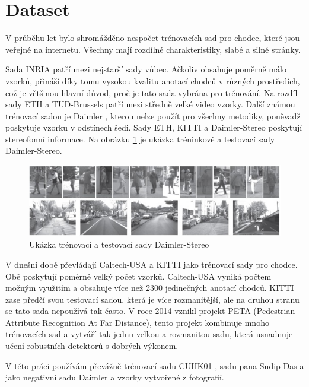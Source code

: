 \section{Dataset} %
V průběhu let bylo shromážděno nespočet trénovacích sad pro chodce, které jsou veřejné na internetu. Všechny mají rozdílné charakteristiky, slabé a silné stránky. 

Sada INRIA \cite{} patří mezi nejstarší sady vůbec. Ačkoliv obsahuje poměrně málo vzorků, přináší díky tomu vysokou kvalitu anotací chodců v různých prostředích, což je většinou hlavní důvod, proč je tato sada vybrána pro trénování. Na rozdíl sady ETH \cite{} a TUD-Brussels \cite{} patří mezi středně velké video vzorky. Další známou trénovací sadou je Daimler \cite{}, kterou nelze použít pro všechny metodiky, poněvadž poskytuje vzorku v odstínech šedi. Sady ETH, KITTI \cite{} a Daimler-Stereo \cite{} poskytují stereofonní informace. Na obrázku \ref{fig:daimler_stereo} je ukázka tréninkové a testovací sady Daimler-Stereo. 

\begin{figure}[H]
\centering
\includegraphics[width=16cm]{figures/daimler_stereo}
\caption{Ukázka trénovací a testovací sady Daimler-Stereo \cite{}}
\label{fig:daimler_stereo}
\end{figure}

V dnešní době převládají Caltech-USA \cite{} a KITTI jako trénovací sady pro chodce. Obě poskytují poměrně velký počet vzorků. Caltech-USA vyniká počtem možným využitím a obsahuje více než 2300 jedinečných anotací chodců. KITTI zase předčí svou testovací sadou, která je více rozmanitější, ale na druhou stranu se tato sada nepoužívá tak často. V roce 2014 vznikl projekt PETA (Pedestrian Attribute Recognition At Far Distance), tento projekt kombinuje mnoho trénovacích sad a vytváří tak jednu velkou a rozmanitou sadu, která usnadnuje učení robustních detektorů s dobrých výkonem.

V této práci používám převážně trénovací sadu CUHK01 \cite{}, sadu pana Sudip Das \cite{sudipdas} a jako negativní sadu Daimler \cite{} a vzorky vytvořené z fotografií.

